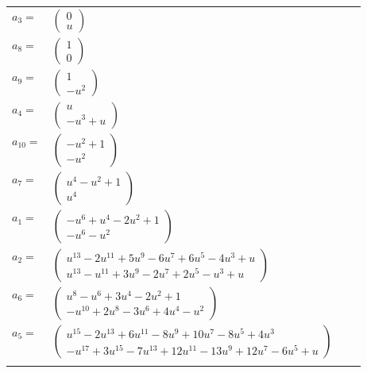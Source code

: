 \documentclass[1p]{elsarticle_modified}
\theoremstyle{definition}
\begin{document}
\begin{tabular}{m{7pt} m{180pt} m{7pt} m{180pt} }
\flushright $a_{3}=$&$\begin{pmatrix}0\\u\end{pmatrix}$ \\
\flushright $a_{8}=$&$\begin{pmatrix}1\\0\end{pmatrix}$ \\
\flushright $a_{9}=$&$\begin{pmatrix}1\\- u^2\end{pmatrix}$ \\
\flushright $a_{4}=$&$\begin{pmatrix}u\\- u^3+u\end{pmatrix}$ \\
\flushright $a_{10}=$&$\begin{pmatrix}- u^2+1\\- u^2\end{pmatrix}$ \\
\flushright $a_{7}=$&$\begin{pmatrix}u^4- u^2+1\\u^4\end{pmatrix}$ \\
\flushright $a_{1}=$&$\begin{pmatrix}- u^6+u^4-2 u^2+1\\- u^6- u^2\end{pmatrix}$ \\
\flushright $a_{2}=$&$\begin{pmatrix}u^{13}-2 u^{11}+5 u^9-6 u^7+6 u^5-4 u^3+u\\u^{13}- u^{11}+3 u^9-2 u^7+2 u^5- u^3+u\end{pmatrix}$ \\
\flushright $a_{6}=$&$\begin{pmatrix}u^8- u^6+3 u^4-2 u^2+1\\- u^{10}+2 u^8-3 u^6+4 u^4- u^2\end{pmatrix}$ \\
\flushright $a_{5}=$&$\begin{pmatrix}u^{15}-2 u^{13}+6 u^{11}-8 u^9+10 u^7-8 u^5+4 u^3\\- u^{17}+3 u^{15}-7 u^{13}+12 u^{11}-13 u^9+12 u^7-6 u^5+u\end{pmatrix}$\\&\end{tabular}
\end{document}
